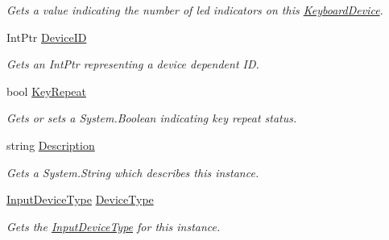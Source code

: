 \begin{DoxyCompactItemize}
\begin{DoxyCompactList}\small\item\em Gets a value indicating the number of led indicators on this \hyperlink{class_open_t_k_1_1_input_1_1_keyboard_device}{Keyboard\-Device}. \end{DoxyCompactList}\item 
Int\-Ptr \hyperlink{class_open_t_k_1_1_input_1_1_keyboard_device_a797379213362e109ae766992cb79b2ee}{Device\-I\-D}
\begin{DoxyCompactList}\small\item\em Gets an Int\-Ptr representing a device dependent I\-D. \end{DoxyCompactList}\item 
bool \hyperlink{class_open_t_k_1_1_input_1_1_keyboard_device_a5a2f02e17370e6ed57f78249cc4b7fde}{Key\-Repeat}
\begin{DoxyCompactList}\small\item\em Gets or sets a System.\-Boolean indicating key repeat status. \end{DoxyCompactList}\item 
string \hyperlink{class_open_t_k_1_1_input_1_1_keyboard_device_a5985a861383790bf012d1c1351890e5c}{Description}
\begin{DoxyCompactList}\small\item\em Gets a System.\-String which describes this instance. \end{DoxyCompactList}\item 
\hyperlink{namespace_open_t_k_1_1_input_a1d147c6256b0adaa5288eec90ed93270}{Input\-Device\-Type} \hyperlink{class_open_t_k_1_1_input_1_1_keyboard_device_a35ba052b764e6b488b6799f839f81848}{Device\-Type}
\begin{DoxyCompactList}\small\item\em Gets the \hyperlink{namespace_open_t_k_1_1_input_a1d147c6256b0adaa5288eec90ed93270}{Input\-Device\-Type} for this instance. \end{DoxyCompactList}\end{DoxyCompactItemize}
